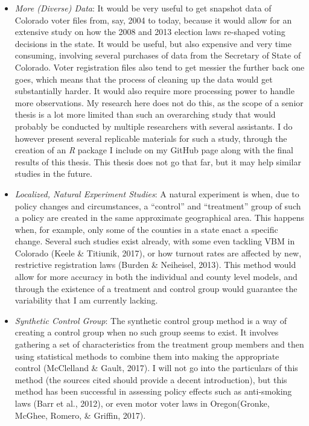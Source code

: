 \documentclass[12pt,twoside]{reedthesis}
\begin{document}
  \begin{itemize}
  \item
    \emph{More (Diverse) Data}: It would be very useful to get snapshot
    data of Colorado voter files from, say, 2004 to today, because it
    would allow for an extensive study on how the 2008 and 2013 election
    laws re-shaped voting decisions in the state. It would be useful, but
    also expensive and very time consuming, involving several purchases of
    data from the Secretary of State of Colorado. Voter registration files
    also tend to get messier the further back one goes, which means that
    the process of cleaning up the data would get substantially harder. It
    would also require more processing power to handle more observations.
    My research here does not do this, as the scope of a senior thesis is
    a lot more limited than such an overarching study that would probably
    be conducted by multiple researchers with several assistants. I do
    however present several replicable materials for such a study, through
    the creation of an \textit{R} package I include on my GitHub page
    along with the final results of this thesis. This thesis does not go
    that far, but it may help similar studies in the future.
  \item
    \emph{Localized, Natural Experiment Studies}: A natural experiment is
    when, due to policy changes and circumstances, a ``control'' and
    ``treatment'' group of such a policy are created in the same
    approximate geographical area. This happens when, for example, only
    some of the counties in a state enact a specific change. Several such
    studies exist already, with some even tackling VBM in Colorado (Keele
    \& Titiunik, 2017), or how turnout rates are affected by new,
    restrictive registration laws (Burden \& Neiheisel, 2013). This method
    would allow for more accuracy in both the individual and county level
    models, and through the existence of a treatment and control group
    would guarantee the variability that I am currently lacking.
  \item
    \emph{Synthetic Control Group}: The synthetic control group method is
    a way of creating a control group when no such group seems to exist.
    It involves gathering a set of characteristics from the treatment
    group members and then using statistical methods to combine them into
    making the appropriate control (McClelland \& Gault, 2017). I will not
    go into the particulars of this method (the sources cited should
    provide a decent introduction), but this method has been successful in
    assessing policy effects such as anti-smoking laws (Barr et al.,
    2012), or even motor voter laws in Oregon(Gronke, McGhee, Romero, \&
    Griffin, 2017).
  \end{itemize}
  
\end{document}
